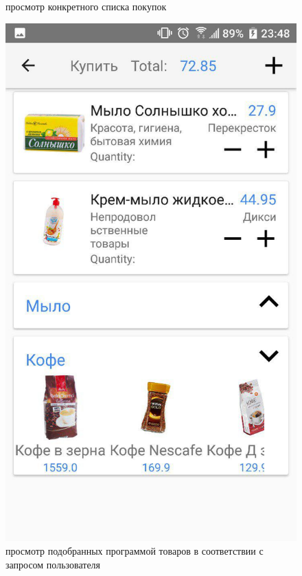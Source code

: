 \begin{figure}[h!]
    \caption{\small{просмотр конкретного списка покупок}}
    \endminipage\hfill
    \includegraphics[height=0.38\textheight]{./screenshots/3/shoplist_custom_fold.jpg}
    \caption{\small{просмотр подобранных программой товаров в соответствии с запросом пользователя}}
    \label{custom}
    \endminipage\hfill

\end{figure}
